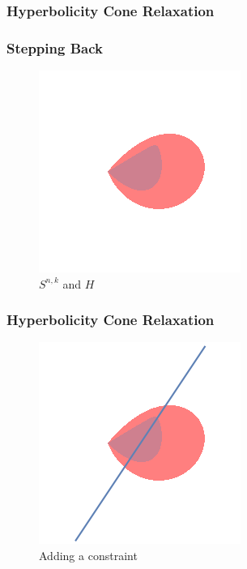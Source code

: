 \documentclass{beamer}
\begin{document}
\begin{frame}
    \frametitle{Hyperbolicity Cone Relaxation}
    \frametitle{Stepping Back}
    \begin{figure}[h]
        \centering
        \includegraphics[width=0.6\linewidth]{comparison.png}
        \caption{$S^{n,k}$ and $H$}%
        \label{fig:just_snk}
    \end{figure}
\end{frame}
\begin{frame}
    \frametitle{Hyperbolicity Cone Relaxation}
    \begin{figure}[htpb]
        \centering
        \includegraphics[width=0.6\linewidth]{comparison_line.png}
        \caption{Adding a constraint}%
        \label{fig:comparison_line}
    \end{figure}
\end{frame}
\end{document}
